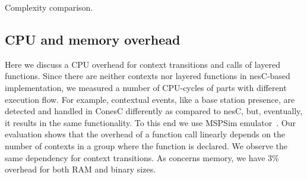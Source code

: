 \begin{table}[!h]
\renewcommand{\arraystretch}{1.3}
\caption{Complexity comparison.}
\label{tab:compres}

\end{table}

\subsection{CPU and memory overhead}

Here we discuss a CPU overhead for context transitions and calls of layered
functions. Since there are neither contexts nor layered functions in nesC-based
implementation, we measured a number of CPU-cycles of parts with different
execution flow. For example, contextual events, like a base station presence,
are detected and handled in ConesC differently as compared to nesC, but,
eventually, it results in the same functionality. To this end we use MSPSim
emulator~\cite{eriksson09}. Our evaluation shows that the overhead of a function
call linearly depends on the number of contexts in a group where the function is
declared. We observe the same dependency for context transitions. As concerns
memory, we have 3\% overhead for both RAM and binary sizes.
